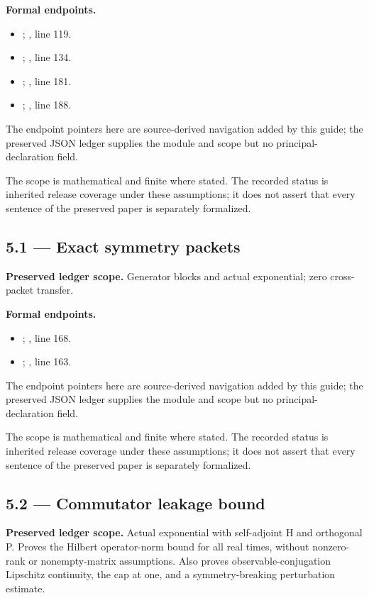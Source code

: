 \textbf{Formal endpoints.}\begin{itemize}
\item {}; , line 119.
\item {}; , line 134.
\item {}; , line 181.
\item {}; , line 188.
\end{itemize}
The endpoint pointers here are source-derived navigation added by this guide; the preserved JSON ledger supplies the module and scope but no principal-declaration field.

The scope is mathematical and finite where stated. The recorded status is inherited release coverage under these assumptions; it does not assert that every sentence of the preserved paper is separately formalized.

\subsection{5.1 — Exact symmetry packets}
\label{result:5.1}
\textbf{Preserved ledger scope.} Generator blocks and actual exponential; zero cross-packet transfer.

\textbf{Formal endpoints.}\begin{itemize}
\item {}; , line 168.
\item {}; , line 163.
\end{itemize}
The endpoint pointers here are source-derived navigation added by this guide; the preserved JSON ledger supplies the module and scope but no principal-declaration field.

The scope is mathematical and finite where stated. The recorded status is inherited release coverage under these assumptions; it does not assert that every sentence of the preserved paper is separately formalized.

\subsection{5.2 — Commutator leakage bound}
\label{result:5.2}
\textbf{Preserved ledger scope.} Actual exponential with self-adjoint H and orthogonal P. Proves the Hilbert operator-norm bound for all real times, without nonzero-rank or nonempty-matrix assumptions. Also proves observable-conjugation Lipschitz continuity, the cap at one, and a symmetry-breaking perturbation estimate.

